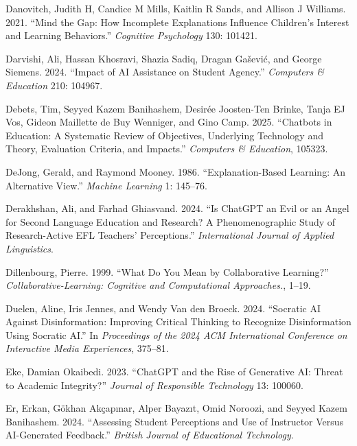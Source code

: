 \documentclass[
  11pt,
]{article}
\newlength{\cslhangindent}
\newenvironment{CSLReferences}[2] %
 {\begin{list}{}{%
  \setlength{\itemindent}{0pt}
  \setlength{\leftmargin}{0pt}
  \setlength{\parsep}{0pt}
  \ifodd #1
   \setlength{\leftmargin}{\cslhangindent}
   \setlength{\itemindent}{-1\cslhangindent}
  \fi
  \setlength{\itemsep}{#2\baselineskip}}}
 {\end{list}}
\begin{document}
\begin{CSLReferences}{1}{0}
Danovitch, Judith H, Candice M Mills, Kaitlin R Sands, and Allison J Williams. 2021. {``Mind the Gap: How Incomplete Explanations Influence Children's Interest and Learning Behaviors.''} \emph{Cognitive Psychology} 130: 101421.

Darvishi, Ali, Hassan Khosravi, Shazia Sadiq, Dragan Gašević, and George Siemens. 2024. {``Impact of AI Assistance on Student Agency.''} \emph{Computers \& Education} 210: 104967.

Debets, Tim, Seyyed Kazem Banihashem, Desirée Joosten-Ten Brinke, Tanja EJ Vos, Gideon Maillette de Buy Wenniger, and Gino Camp. 2025. {``Chatbots in Education: A Systematic Review of Objectives, Underlying Technology and Theory, Evaluation Criteria, and Impacts.''} \emph{Computers \& Education}, 105323.

DeJong, Gerald, and Raymond Mooney. 1986. {``Explanation-Based Learning: An Alternative View.''} \emph{Machine Learning} 1: 145--76.

Derakhshan, Ali, and Farhad Ghiasvand. 2024. {``Is ChatGPT an Evil or an Angel for Second Language Education and Research? A Phenomenographic Study of Research-Active EFL Teachers' Perceptions.''} \emph{International Journal of Applied Linguistics}.

Dillenbourg, Pierre. 1999. {``What Do You Mean by Collaborative Learning?''} \emph{Collaborative-Learning: Cognitive and Computational Approaches.}, 1--19.

Duelen, Aline, Iris Jennes, and Wendy Van den Broeck. 2024. {``Socratic AI Against Disinformation: Improving Critical Thinking to Recognize Disinformation Using Socratic AI.''} In \emph{Proceedings of the 2024 ACM International Conference on Interactive Media Experiences}, 375--81.

Eke, Damian Okaibedi. 2023. {``ChatGPT and the Rise of Generative AI: Threat to Academic Integrity?''} \emph{Journal of Responsible Technology} 13: 100060.

Er, Erkan, Gökhan Akçapınar, Alper Bayazıt, Omid Noroozi, and Seyyed Kazem Banihashem. 2024. {``Assessing Student Perceptions and Use of Instructor Versus AI-Generated Feedback.''} \emph{British Journal of Educational Technology}.


\end{CSLReferences}
\end{document}

